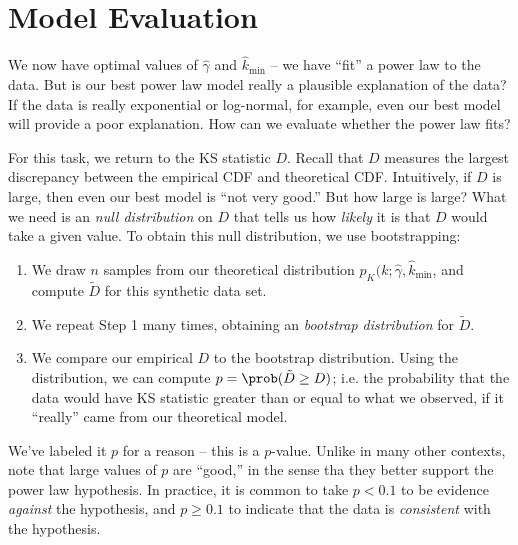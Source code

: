 \documentclass[english]{scrartcl}
\begin{document}
\section*{Model Evaluation}

	We now have optimal values of $\hat{\gamma}$ and $\hat{k}_{\text{min}}$ -- we have ``fit'' a power law to the data. But is our best power law model really a plausible explanation of the data? If the data is really exponential or log-normal, for example, even our best model will provide a poor explanation. How can we evaluate whether the power law fits? 

	For this task, we return to the KS statistic $D$. Recall that $D$ measures the largest discrepancy between the empirical CDF and theoretical CDF. Intuitively, if $D$ is large, then even our best model is ``not very good.'' But how large is large? What we need is an \emph{null distribution} on $D$ that tells us how \emph{likely} it is that $D$ would take a given value. To obtain this null distribution, we use bootstrapping: 
	\begin{enumerate}
		\item We draw $n$ samples from our theoretical distribution $p_K(k;\hat{\gamma}, \hat{k}_{\text{min}}$, and compute $\tilde{D}$ for this synthetic data set. 
		\item We repeat Step 1 many times, obtaining an \emph{bootstrap distribution} for   $\tilde{D}$. 
		\item We compare our empirical $D$ to the bootstrap distribution. Using the distribution, we can compute $p = \prob(\tilde{D} \geq D)$; i.e. the probability that the data would have KS statistic greater than or equal to what we observed, if it ``really'' came from our theoretical model. 
	\end{enumerate}
	We've labeled it $p$ for a reason -- this is a $p$-value. Unlike in many other contexts, note that large values of $p$ are ``good,'' in the sense tha they better support the power law hypothesis. In practice, it is common to take $p < 0.1$ to be evidence \emph{against} the hypothesis, and $p \geq 0.1$ to indicate that the data is \emph{consistent} with the hypothesis. 

{}

\end{document}
